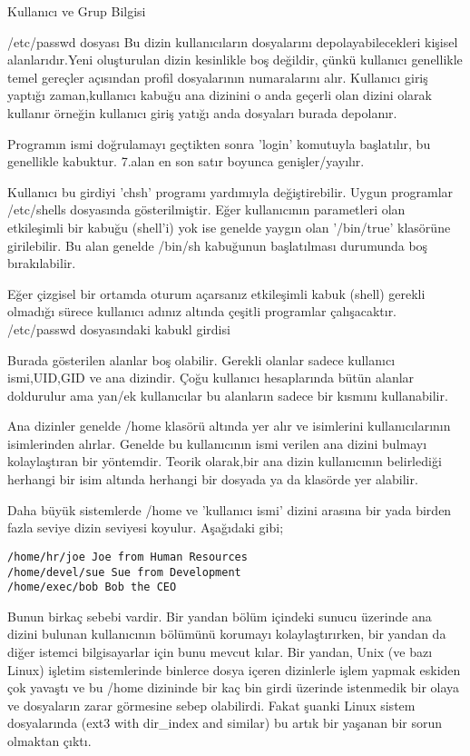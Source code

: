\begin{section}{Kullanıcı ve Grup Bilgisi}
\begin{subsection}{/etc/passwd dosyası}
Bu dizin kullanıcıların dosyalarını depolayabilecekleri kişisel alanlarıdır.Yeni oluşturulan dizin kesinlikle boş değildir, çünkü kullanıcı genellikle temel gereçler açısından profil dosyalarının numaralarını alır. Kullanıcı giriş yaptığı zaman,kullanıcı kabuğu ana dizinini o anda geçerli olan dizini olarak kullanır örneğin kullanıcı giriş yatığı anda dosyaları burada depolanır.

Programın ismi doğrulamayı geçtikten sonra 'login' komutuyla başlatılır, bu genellikle kabuktur. 7.alan en son satır boyunca genişler/yayılır.

Kullanıcı bu girdiyi 'chsh' programı yardımıyla değiştirebilir. Uygun programlar /etc/shells dosyasında gösterilmiştir. Eğer kullanıcının parametleri olan etkileşimli bir kabuğu (shell'i) yok ise genelde yaygın olan '/bin/true' klasörüne girilebilir. Bu alan genelde /bin/sh kabuğunun başlatılması durumunda boş bırakılabilir.

Eğer çizgisel bir ortamda oturum açarsanız etkileşimli kabuk (shell) gerekli olmadığı sürece kullanıcı adınız altında çeşitli programlar çalışacaktır. /etc/passwd dosyasındaki kabukl girdisi


Burada gösterilen alanlar boş olabilir. Gerekli olanlar sadece kullanıcı ismi,UID,GID ve ana dizindir. Çoğu kullanıcı hesaplarında bütün alanlar doldurulur ama yan/ek kullanıcılar bu alanların sadece bir kısmını kullanabilir.

Ana dizinler genelde /home klasörü altında yer alır ve isimlerini kullanıcılarının isimlerinden alırlar. Genelde bu kullanıcının ismi verilen ana dizini bulmayı kolaylaştıran bir yöntemdir. Teorik olarak,bir ana dizin kullanıcının belirlediği herhangi bir isim altında herhangi bir dosyada ya da klasörde yer alabilir.

Daha büyük sistemlerde /home ve 'kullanıcı ismi' dizini arasına bir yada birden fazla seviye dizin seviyesi koyulur. Aşağıdaki gibi;
\begin{verbatim}
/home/hr/joe Joe from Human Resources
/home/devel/sue Sue from Development
/home/exec/bob Bob the CEO
\end{verbatim}

Bunun birkaç sebebi vardir. Bir yandan bölüm içindeki sunucu üzerinde ana dizini bulunan kullanıcının bölümünü korumayı kolaylaştırırken, bir yandan da diğer istemci bilgisayarlar için bunu mevcut kılar. Bir yandan, Unix (ve bazı Linux) işletim sistemlerinde binlerce dosya içeren dizinlerle işlem yapmak eskiden çok yavaştı ve bu /home dizininde bir kaç bin girdi üzerinde istenmedik bir olaya ve dosyaların zarar görmesine sebep olabilirdi. Fakat şuanki Linux sistem dosyalarında (ext3 with dir\_index and similar) bu artık bir yaşanan bir sorun olmaktan çıktı.


\end{subsection}
\end{section}
